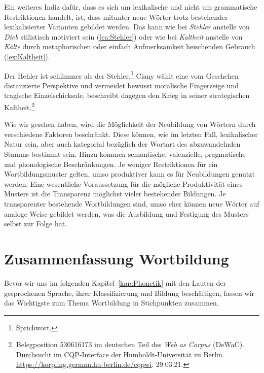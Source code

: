 Ein weiteres Indiz dafür, dass es sich um lexikalische und nicht um grammatische Restriktionen handelt, ist, dass mitunter neue Wörter trotz bestehender lexikalisierter Varianten gebildet werden. Das kann wie bei \textit{Stehler} anstelle von \textit{Dieb} stilistisch motiviert sein (\ref{ea:Stehler}) oder wie bei \textit{Kaltheit} anstelle von \textit{Kälte} durch metaphorischen oder einfach Aufmerksamkeit heischenden Gebrauch (\ref{ex:Kaltheit}).
 
 \ea \label{ea:Stehler_Kaltheit}
\ea \label{ea:Stehler} Der Hehler ist schlimmer als der Stehler.\footnote{Sprichwort.}
\ex \label{ex:Kaltheit} Clany wählt eine vom Geschehen distanzierte Perspektive und vermeidet bewusst moralische Fingerzeige und tragische Einzelschicksale, beschreibt dagegen den Krieg in seiner strategischen Kaltheit.\footnote{Belegposition 530616173 im deutschen Teil des \textit{Web as Corpus} (DeWaC). Durchsucht im CQP-Interface der Humboldt-Universität zu Berlin. \url{https://korpling.german.hu-berlin.de/cqpwi}. 29.03.21.}
\z 
\z 

Wie wir gesehen haben, wird die Möglichkeit der Neubildung von Wörtern durch verschiedene Faktoren beschränkt. Diese können, wie im letzten Fall, lexikalischer Natur sein, aber auch kategorial bezüglich der Wortart des abzuwandelnden Stamms  bestimmt sein. Hinzu kommen semantische, valenzielle, pragmatische und phonologische Beschränkungen. Je weniger Restriktionen für ein Wortbildungsmuster gelten, umso produktiver kann es für Neubildungen genutzt werden. Eine wesentliche Voraussetzung für die mögliche Produktivität eines Musters ist die Transparenz möglichst vieler bestehender Bildungen. Je transparenter bestehende Wortbildungen sind, umso eher können neue Wörter auf analoge Weise gebildet werden, was die Ausbildung und Festigung des Musters selbst zur Folge hat. 

\section{Zusammenfassung Wortbildung}\label{section:Zfsg_Wortbildung}

Bevor wir uns im folgenden Kapitel~\ref{kap:Phonetik} mit den Lauten der gesprochenen Sprache, ihrer Klassifizierung und Bildung beschäftigen, fassen wir das Wichtigste zum Thema Wortbildung in Stichpunkten zusammen. 
 
